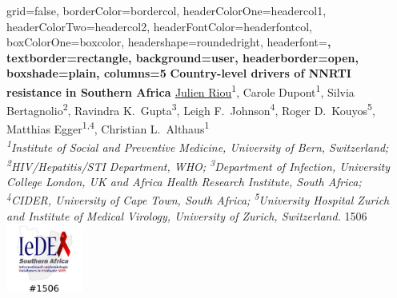 \documentclass[paperwidth=137.2cm,paperheight=91.4cm]{baposter}
\begin{document}
\begin{poster}{
grid=false,
borderColor=bordercol, %
headerColorOne=headercol1, %
headerColorTwo=headercol2, %
headerFontColor=headerfontcol, %
boxColorOne=boxcolor, %
headershape=roundedright, %
headerfont=\Large\sf\bf, %
textborder=rectangle,
background=user,
headerborder=open, %
boxshade=plain,
columns=5
}
{}
%
%
{\sf\bf \Huge{ Country-level drivers of NNRTI resistance in Southern Africa }\vspace{.1em}} %
{ \underline{Julien Riou}\textsuperscript{1}, Carole Dupont\textsuperscript{1}, Silvia Bertagnolio\textsuperscript{2}, Ravindra K.~Gupta\textsuperscript{3}, Leigh F.~Johnson\textsuperscript{4}, Roger D.~Kouyos\textsuperscript{5}, Matthias Egger\textsuperscript{1,4}, Christian L.~Althaus\textsuperscript{1}\\ \vspace{.2em} %
{\smaller \textit{ \textsuperscript{1}Institute of Social and Preventive Medicine, University of Bern, Switzerland; 
	\textsuperscript{2}HIV/Hepatitis/STI Department, WHO; \textsuperscript{3}Department of Infection, University College London, UK and Africa Health Research Institute, South Africa; \textsuperscript{4}CIDER, University of Cape Town, South Africa;  \textsuperscript{5}University Hospital Zurich and Institute of Medical Virology, University of Zurich, Switzerland. }}} %
{1506\hspace{.5cm} \includegraphics[height=6em]{figures/ideasa2.png} } %



\end{poster}
\end{document}
